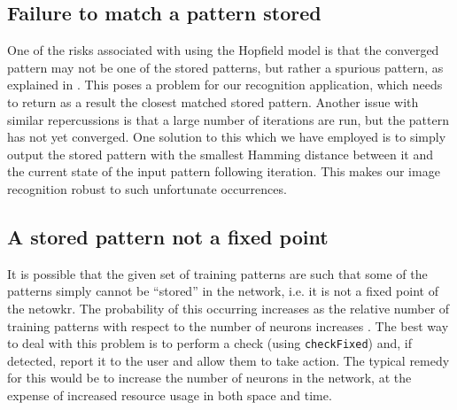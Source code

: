 \subsection{Failure to match a pattern stored}
One of the risks associated with using the Hopfield model is that the converged pattern may not be one of the stored patterns, but rather a spurious pattern, as explained in . This poses a problem for our recognition application, which needs to return as a result the closest matched stored pattern. Another issue with similar repercussions is that a large number of iterations are run, but the pattern has not yet converged.
One solution to this which we have employed  is to simply output the stored pattern with the smallest Hamming distance between it and the current state of the input pattern following iteration. This makes our image recognition robust to such unfortunate occurrences.


\subsection{A stored pattern not a fixed point}
It is possible that the given set of training patterns are such that some of the patterns simply cannot be ``stored'' in the network, i.e. it is not a fixed point of the netowkr. The probability of this occurring increases as the relative number of training patterns with respect to the number of neurons increases .
The best way to deal with this problem is to perform a check (using \texttt{checkFixed})  and, if detected, report it  to the user and allow them to take action. The typical remedy for this would be to increase the number of neurons in the network, at the expense of increased resource usage in both space and time.

